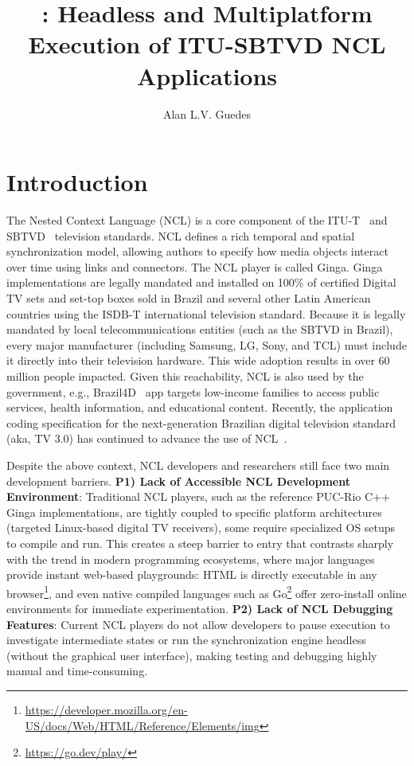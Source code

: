 \documentclass[sigconf]{acmart}
\title{\projectname{}: Headless and Multiplatform Execution of ITU-SBTVD NCL Applications}
\author{Alan L.V. Guedes}
\affiliation{%
  \institution{Computer Science, University of Reading}
  \city{Reading}
  \country{UK}
}
\begin{document}
\maketitle

\section{Introduction}

The Nested Context Language (NCL) is a core component of the ITU-T~\cite{ITU_H761} and SBTVD~\cite{abnt_15606_2_2023} television standards. NCL defines a rich temporal and spatial synchronization model, allowing authors to specify how media objects interact over time using links and connectors. The NCL player is called Ginga. Ginga implementations are legally mandated and installed on 100\% of certified Digital TV sets and set-top boxes sold in Brazil and several other Latin American countries using the ISDB-T international television standard. Because it is legally mandated by local telecommunications entities (such as the SBTVD in Brazil), every major manufacturer (including Samsung, LG, Sony, and TCL) must include it directly into their television hardware. This wide adoption results in over 60 million people impacted. Given this reachability, NCL is also used by the government, e.g., Brazil4D~\cite{castro2016brazil} app targets low-income families to access public services, health information, and educational content. Recently, the application coding specification for the next-generation Brazilian digital television standard (aka, TV 3.0) has continued to advance the use of NCL~\cite{santos2026overview}. 

Despite the above context, NCL developers and researchers still face two main development barriers. \textbf{P1) Lack of Accessible NCL Development Environment}: Traditional NCL players, such as the reference PUC-Rio C++ Ginga implementations, are tightly coupled to specific platform architectures (targeted Linux-based digital TV receivers), some require specialized OS setups to compile and run. This creates a steep barrier to entry that contrasts sharply with the trend in modern programming ecosystems, where major languages provide instant web-based playgrounds: HTML is directly executable in any browser\footnote{\url{https://developer.mozilla.org/en-US/docs/Web/HTML/Reference/Elements/img}}, and even native compiled languages such as Go\footnote{\url{https://go.dev/play/}} offer zero-install online environments for immediate experimentation. \textbf{P2) Lack of NCL Debugging Features}: Current NCL players do not allow developers to pause execution to investigate intermediate states or run the synchronization engine headless (without the graphical user interface), making testing and debugging highly manual and time-consuming.
\end{document}
